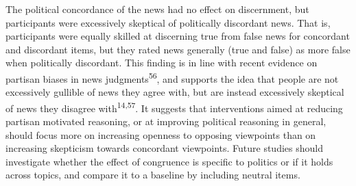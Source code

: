 \documentclass[
  doc,floatsintext]{apa6}
\begin{document}
The political concordance of the news had no effect on discernment, but participants were excessively skeptical of politically discordant news. That is, participants were equally skilled at discerning true from false news for concordant and discordant items, but they rated news generally (true and false) as more false when politically discordant. This finding is in line with recent evidence on partisan biases in news judgments\textsuperscript{56}, and supports the idea that people are not excessively gullible of news they agree with, but are instead excessively skeptical of news they disagree with\textsuperscript{14,57}. It suggests that interventions aimed at reducing partisan motivated reasoning, or at improving political reasoning in general, should focus more on increasing openness to opposing viewpoints than on increasing skepticism towards concordant viewpoints. Future studies should investigate whether the effect of congruence is specific to politics or if it holds across topics, and compare it to a baseline by including neutral items.
\end{document}
